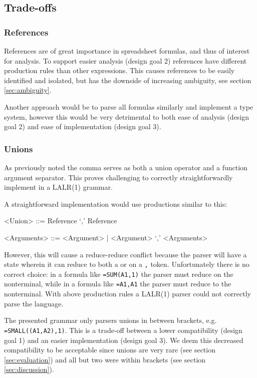 \documentclass[conference]{IEEEtran}
\begin{document}
\subsection{Trade-offs}

\subsubsection{\textbf{References}}
\label{tradeoff:references}

References are of great importance in spreadsheet formulas, and thus of interest for analysis.
To support easier analysis (design goal 2) references have different production rules than other expressions.
This causes references to be easily identified and isolated, but has the downside of increasing ambiguity, see section \ref{sec:ambiguity}. 

Another approach would be to parse all formulas similarly and implement a type system, however this would be very detrimental to both ease of analysis (design goal 2) and ease of implementation (design goal 3).

\subsubsection{\textbf{Unions}}
\label{subsec:desing:unions}

As previously noted the comma serves as both a union operator and a function argument separator.
This proves challenging to correctly straightforwardly implement in a LALR(1) grammar.

A straightforward implementation would use productions similar to this:

\begin{grammar}
<Union> ::= Reference `,' Reference

<Arguments> ::= <Argument> | <Argument> `,' <Arguments>
\end{grammar}

However, this will cause a reduce-reduce conflict because the parser will have a state wherein it can reduce to both a  or  on a \texttt{,} token.
Unfortunately there is no correct choice: in a formula like \texttt{=SUM(A1,1)} the parser must reduce on the  nonterminal, while in a formula like \texttt{=A1,A1} the parser must reduce to the  nonterminal.
With above production rules a LALR(1) parser could not correctly parse the language.

The presented grammar only parsers unions in between brackets, e.g. \texttt{=SMALL((A1,A2),1)}.
This is a trade-off between a lower compatibility (design goal 1) and an easier implementation (design goal 3).
We deem this decreased compatibility to be acceptable since unions are very rare (see section \ref{sec:evaluation}) and all but two were within brackets (see section \ref{sec:discussion}).
\end{document}
